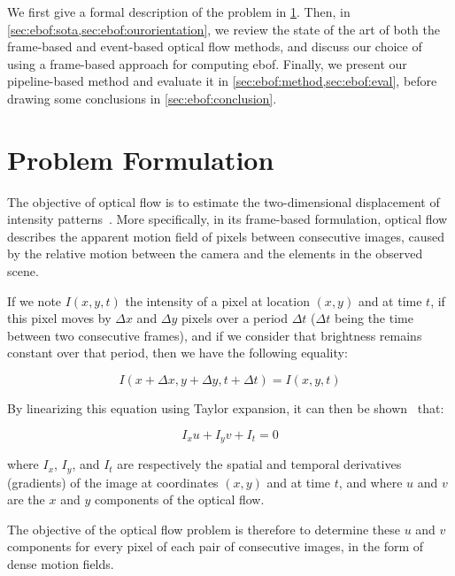 We first give a formal description of the problem in \cref{sec:ebof:formulation}. Then, in \cref{sec:ebof:sota,sec:ebof:ourorientation}, we review the state of the art of both the frame-based and event-based optical flow methods, and discuss our choice of using a frame-based approach for computing \acrshort{ebof}. Finally, we present our pipeline-based method and evaluate it in \cref{sec:ebof:method,sec:ebof:eval}, before drawing some conclusions in \cref{sec:ebof:conclusion}.


\section{Problem Formulation}\label{sec:ebof:formulation}

The objective of optical flow is to estimate the two-dimensional displacement of intensity patterns~\cite{Fortun2015OpticalFM}. More specifically, in its frame-based formulation, optical flow describes the apparent motion field of pixels between consecutive images, caused by the relative motion between the camera and the elements in the observed scene.

If we note \(I(x, y, t)\) the intensity of a pixel at location \((x, y)\) and at time \(t\), if this pixel moves by \(\Delta x\) and \(\Delta y\) pixels over a period \(\Delta t\) (\(\Delta t\) being the time between two consecutive frames), and if we consider that brightness remains constant over that period, then we have the following equality:

\begin{equation}\label{eq:ebof:formulation_1}
  I(x+\Delta x, y+\Delta y, t+\Delta t) = I(x, y, t)
\end{equation}

By linearizing this equation using Taylor expansion, it can then be shown~\cite{Horn1981DeterminingOF} that:

\begin{equation}\label{eq:ebof:formulation_2}
  I_x u + I_y v + I_t = 0
\end{equation}

where \(I_x\), \(I_y\), and \(I_t\) are respectively the spatial and temporal derivatives (gradients) of the image at coordinates \((x, y)\) and at time \(t\), and where \(u\) and \(v\) are the \(x\) and \(y\) components of the optical flow.

The objective of the optical flow problem is therefore to determine these \(u\) and \(v\) components for every pixel of each pair of consecutive images, in the form of dense motion fields.


